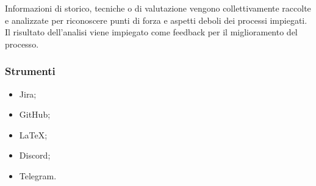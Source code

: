 \par Informazioni di storico, tecniche o di valutazione vengono collettivamente raccolte e analizzate per riconoscere punti di forza e aspetti deboli dei processi impiegati. Il risultato dell'analisi viene impiegato come feedback per il miglioramento del processo.

\subsubsection{Strumenti}
\begin{itemize}
  \item Jira;
  \item GitHub;
  \item LaTeX;
  \item Discord;
  \item Telegram.
\end{itemize}